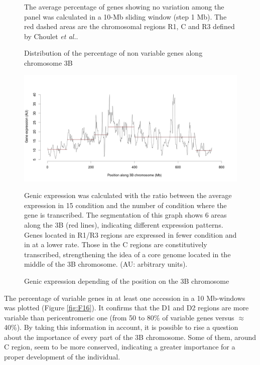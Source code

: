 \documentclass[a4paper, 12pt]{article}
\begin{document}
\begin{onehalfspace}
\begin{figure}
      \vspace{0.5cm}
      \caption{Distribution of the percentage of non variable genes along chromosome 3B}
      \label{fig:F17}
    \footnotesize{The average percentage of genes showing no variation among the panel was calculated in a 10-Mb sliding window (step 1 Mb).  The red dashed areas are the chromosomal regions R1, C and R3 defined by Choulet \textit{et al.}.}
    \end{figure}
    \begin{figure}
    \vspace{-1cm}
      \centering \includegraphics[scale=0.19]{Figures/Figure_18.jpg}
      \vspace{0.5cm}
      \caption{Genic expression depending of the position on the 3B chromosome}
      \label{fig:F18}
   \footnotesize{ Genic expression was calculated with the ratio between the average expression in 15 condition and the number of condition where the gene is transcribed. The segmentation of this graph shows 6 areas along the 3B (red lines), indicating different expression patterns. Genes located in R1/R3 regions are expressed in fewer condition and in at a lower rate. Those in the C regions are constitutively transcribed, strengthening the idea of a core genome located in the middle of the 3B chromosome. (AU: arbitrary units).}
    \end{figure}
\addtocounter{page}{-1}
\newpage
\clearpage 

The percentage of variable genes in at least one accession in a 10 Mb-windows was plotted (Figure \ref{fig:F16}). It confirms that the D1 and D2 regions are more variable than pericentromeric one (from 50 to 80\% of variable genes versus $\approx$ 40\%). By taking this information in account, it is possible to rise a question about the importance of every part of the 3B chromosome. Some of them, around C region, seem to be more conserved, indicating a greater importance for a proper development of the individual. 


\end{onehalfspace}
\end{document}
